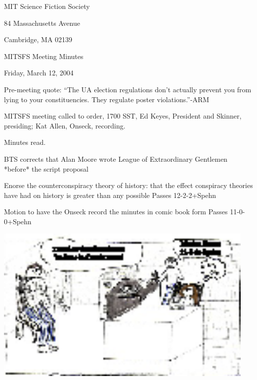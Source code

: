 \documentclass[10pt]{article}
\begin{document}
\begin{center}

MIT Science Fiction Society 

84 Massachusetts Avenue

Cambridge, MA 02139

\vspace{12pt}

MITSFS Meeting Minutes 

Friday, March 12, 2004

\end{center}
 
\vspace{18pt}

\setlength{\parskip}{6pt}

\noindent
Pre-meeting quote: ``The UA election regulations don't actually
prevent you from lying to your constituencies.  They regulate poster
violations.''-ARM

MITSFS meeting called to order, 1700 SST, Ed Keyes, President and
Skinner, presiding; Kat Allen,  Onseck, recording.

Minutes read.

BTS corrects that Alan Moore wrote League of Extraordinary Gentlemen
*before* the script proposal

Enorse the counterconspiracy theory of history: that the effect
conspiracy theories have had on history is greater than any possible 
Passes 12-2-2+Spehn

Motion to have the Onseck record the minutes in comic book form
Passes 11-0-0+Spehn
 
\includegraphics[height = 3in]{panel.2004-03-12.01.eps}
\end{document}
